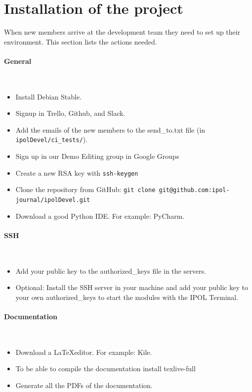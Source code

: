 \section{Installation of the project}
When new members arrive at the development team they need to set up their environment. This section lists the actions needed.

\paragraph{General} \hspace{0pt} \\
\begin{itemize}
    \item Install Debian Stable.
    \item Signup in Trello, Github, and Slack.
    \item Add the emails of the new members to the send\_to.txt file (in {\tt ipolDevel/ci\_tests/}).
    \item Sign up in our Demo Editing group in Google Groups
    \item Create a new RSA key with {\tt ssh-keygen}
    \item Clone the repository from GitHub: {\tt git clone git@github.com:ipol-journal/ipolDevel.git}
    \item Download a good Python IDE. For example: PyCharm.
\end{itemize}

\paragraph{SSH} \hspace{0pt} \\
\begin{itemize}
    \item Add your public key to the authorized\_keys file in the servers.
    \item Optional: Install the SSH server in your machine and add your public key to your own authorized\_keys to start the modules with the IPOL Terminal.
\end{itemize}

\paragraph{Documentation} \hspace{0pt} \\
\begin{itemize}
    \item Download a \LaTeX editor. For example: Kile.
    \item To be able to compile the documentation install texlive-full
    \item Generate all the PDFs of the documentation.
\end{itemize}

